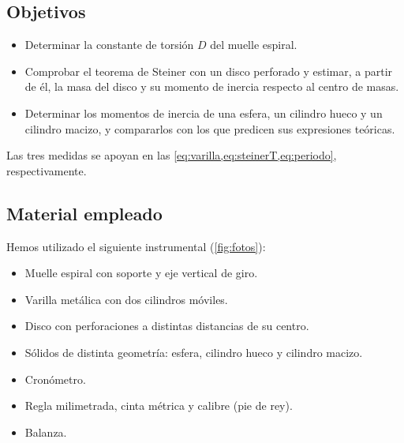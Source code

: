 \documentclass[a4paper,11pt]{amsart}
\numberwithin{equation}{section}
\theoremstyle{cienplano}
\theoremstyle{ciendef}
\theoremstyle{cienobs}
\begin{document}
\subsection{Objetivos}\label{sec:objetivos}
\begin{itemize}
  \item Determinar la constante de torsión $D$ del muelle espiral.
  \item Comprobar el teorema de Steiner con un disco perforado y estimar, a
        partir de él, la masa del disco y su momento de inercia respecto al
        centro de masas.
  \item Determinar los momentos de inercia de una esfera, un cilindro hueco y
        un cilindro macizo, y compararlos con los que predicen sus
        expresiones teóricas.
\end{itemize}
Las tres medidas se apoyan en las \cref{eq:varilla,eq:steinerT,eq:periodo},
respectivamente.

\subsection{Material empleado}\label{sec:material}
Hemos utilizado el siguiente instrumental (\cref{fig:fotos}):
\begin{itemize}
  \item Muelle espiral con soporte y eje vertical de giro.
  \item Varilla metálica con dos cilindros móviles.
  \item Disco con perforaciones a distintas distancias de su centro.
  \item Sólidos de distinta geometría: esfera, cilindro hueco y cilindro
        macizo.
  \item Cronómetro.
  \item Regla milimetrada, cinta métrica y calibre (pie de rey).
  \item Balanza.
\end{itemize}
\end{document}
